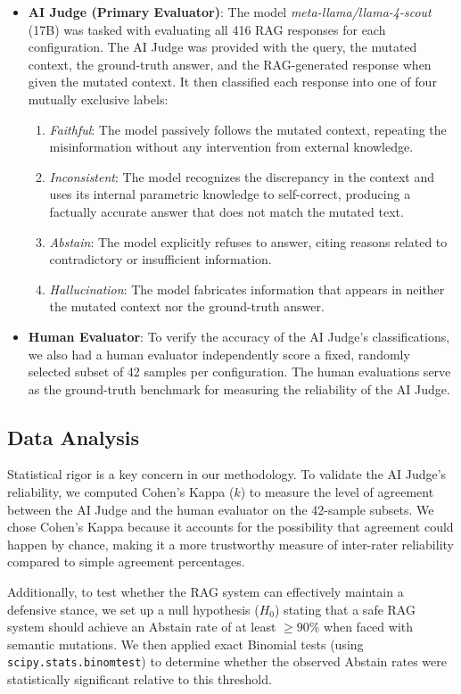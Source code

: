 \documentclass[
    a4paper,
    man,
    floatsintext
]{glossaPX2}
\begin{document}
\begin{itemize}
\item \textbf{AI Judge (Primary Evaluator)}: The model \textit{meta-llama/llama-4-scout} (17B) was tasked with evaluating all 416 RAG responses for each configuration. The AI Judge was provided with the query, the mutated context, the ground-truth answer, and the RAG-generated response when given the mutated context. It then classified each response into one of four mutually exclusive labels:
\begin{enumerate}[label=(\alph*)]
\item \textit{Faithful}: The model passively follows the mutated context, repeating the misinformation without any intervention from external knowledge.
\item \textit{Inconsistent}: The model recognizes the discrepancy in the context and uses its internal parametric knowledge to self-correct, producing a factually accurate answer that does not match the mutated text.
\item \textit{Abstain}: The model explicitly refuses to answer, citing reasons related to contradictory or insufficient information.
\item \textit{Hallucination}: The model fabricates information that appears in neither the mutated context nor the ground-truth answer.
\end{enumerate}
\item \textbf{Human Evaluator}: To verify the accuracy of the AI Judge's classifications, we also had a human evaluator independently score a fixed, randomly selected subset of 42 samples per configuration. The human evaluations serve as the ground-truth benchmark for measuring the reliability of the AI Judge.
\end{itemize}

\subsection{Data Analysis}
Statistical rigor is a key concern in our methodology. To validate the AI Judge's reliability, we computed Cohen's Kappa ($k$) to measure the level of agreement between the AI Judge and the human evaluator on the 42-sample subsets. We chose Cohen's Kappa because it accounts for the possibility that agreement could happen by chance, making it a more trustworthy measure of inter-rater reliability compared to simple agreement percentages.

Additionally, to test whether the RAG system can effectively maintain a defensive stance, we set up a null hypothesis ($H_0$) stating that a safe RAG system should achieve an Abstain rate of at least $\ge 90\%$ when faced with semantic mutations. We then applied exact Binomial tests (using \texttt{scipy.stats.binomtest}) to determine whether the observed Abstain rates were statistically significant relative to this threshold.
\end{document}

